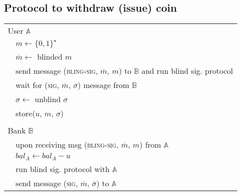 \documentclass{report}
\begin{document}
\begin{adjustwidth}{2em}{2em}
	\subsection{Protocol to withdraw (issue) coin}
	\begin{tikzpicture}
	\end{tikzpicture}
	\begin{tabular}{ll}
		\multicolumn{2}{l}{User $\mathbb{A}$} \\
		& $m \leftarrow \{ 0,1 \}^{\star}$ \\
		& $\overline{m} \leftarrow$ blinded $m$ \\
		& send message (\textsc{bling-sig}, $\overline{m}$, $m$) to $\mathbb{B}$ and run blind sig. protocol \\
		& wait for (\textsc{sig}, $\overline{m}$, $\overline{\sigma}$) message from $\mathbb{B}$ \\
		& $\sigma \leftarrow$ unblind $\sigma$ \\
		& store($u$, $m$, $\sigma$) \\
		\\
		\multicolumn{2}{l}{Bank $\mathbb{B}$} \\
		& upon receiving msg (\textsc{bling-sig}, $\overline{m}$, $m$) from $\mathbb{A}$ \\
		& $bal_A \leftarrow bal_A - u$ \\
		& run blind sig. protocol with $\mathbb{A}$ \\
		& send message (\textsc{sig}, $\overline{m}$, $\overline{\sigma}$) to $\mathbb{A}$
	\end{tabular}

\end{adjustwidth}
\end{document}
